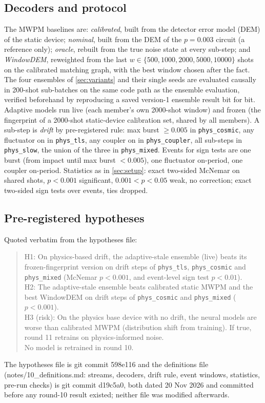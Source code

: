 \documentclass[11pt,a4paper]{article}
\newcommand{\reg}[1]{\texttt{#1}}
\begin{document}
\subsection{Decoders and protocol}\label{sec:phys-protocol}
The MWPM baselines are: \emph{calibrated}, built from the detector error model (DEM) of the static device;
\emph{nominal}, built from the DEM of the $p=0.003$ circuit (a reference only); \emph{oracle}, rebuilt from
the true noise state at every sub-step; and \emph{WindowDEM}, reweighted from the last
$w\in\{500, 1000, 2000, 5000, 10000\}$ shots on the calibrated matching graph, with the best window chosen
after the fact. The four ensembles of \cref{sec:variants} and their single seeds are evaluated causally in
200-shot sub-batches on the same code path as the ensemble evaluation, verified beforehand by reproducing a
saved version-1 ensemble result bit for bit. Adaptive models run live (each member's own 2000-shot window)
and frozen (the fingerprint of a 2000-shot static-device calibration set, shared by all members). A
sub-step is \emph{drift} by pre-registered rule: max burst $\ge0.005$ in \reg{phys\_cosmic}, any fluctuator
on in \reg{phys\_tls}, any coupler on in \reg{phys\_coupler}, all sub-steps in \reg{phys\_slow}, the union
of the three in \reg{phys\_mixed}. Events for sign tests are one burst (from impact until max burst
$<0.005$), one fluctuator on-period, one coupler on-period. Statistics as in \cref{sec:setup}: exact
two-sided McNemar on shared shots, $p<0.001$ significant, $0.001<p<0.05$ weak, no correction; exact
two-sided sign tests over events, ties dropped.

\subsection{Pre-registered hypotheses}\label{sec:phys-prereg}
Quoted verbatim from the hypotheses file:
\begin{quote}\small
H1: On physics-based drift, the adaptive-stale ensemble (live) beats its frozen-fingerprint version on
drift steps of \reg{phys\_tls}, \reg{phys\_cosmic} and \reg{phys\_mixed} (McNemar $p<0.001$, and
event-level sign test $p<0.01$).\\
H2: The adaptive-stale ensemble beats calibrated static MWPM and the best WindowDEM on drift steps of
\reg{phys\_cosmic} and \reg{phys\_mixed} ($p<0.001$).\\
H3 (risk): On the physics base device with no drift, the neural models are worse than calibrated MWPM
(distribution shift from training). If true, round 11 retrains on physics-informed noise.\\
No model is retrained in round 10.
\end{quote}
\noindent The hypotheses file is git commit 598e116 and the definitions file (notes/10\_definitions.md:
streams, decoders, drift rule, event windows, statistics, pre-run checks) is git commit d19c5a0, both dated
20 Nov 2026 and committed before any round-10 result existed; neither file was modified afterwards.
\end{document}
